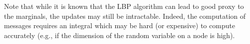 Note that while it is known that the LBP algorithm can lead to good proxy to the marginals, the updates may still be intractable. Indeed, the computation of messages requires an integral which may be hard (or expensive) to compute accurately (e.g., if the dimension of the random variable on a node is high).







